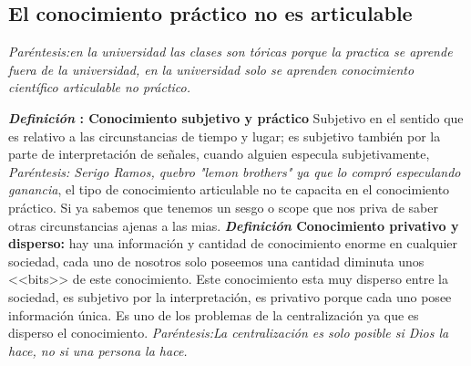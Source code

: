 \subsection{El conocimiento práctico no es articulable}
\emph{Paréntesis:en la universidad las clases son tóricas porque la practica se aprende fuera de la universidad, en la universidad solo se aprenden conocimiento científico articulable no práctico.}

\textbf{\emph{Definición} : Conocimiento subjetivo y práctico} Subjetivo en el sentido que es relativo a las circunstancias de tiempo y lugar; es subjetivo también por la parte de interpretación de señales, cuando alguien especula subjetivamente, \emph{Paréntesis: Serigo Ramos, quebro "lemon brothers" ya que lo compró especulando ganancia}, el tipo de conocimiento articulable no te capacita en el conocimiento práctico.  \newline 
Si ya sabemos que tenemos un sesgo o scope que nos priva de saber otras circunstancias ajenas a las mias. 
\textbf{\emph{Definición} Conocimiento privativo y disperso:} hay una información y cantidad de conocimiento enorme en cualquier sociedad, cada uno de nosotros solo poseemos una cantidad diminuta unos <<bits>> de este conocimiento. Este conocimiento esta muy disperso entre la sociedad, es subjetivo por la interpretación, es privativo porque cada uno posee información única. Es uno de los problemas de la centralización ya que es disperso el conocimiento. \emph{Paréntesis:La centralización es solo posible si Dios la hace, no si una persona la hace.}

